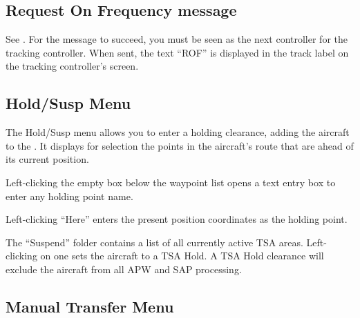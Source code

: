 \documentclass[a4paper,oneside,11pt]{memoir}
\begin{document}
\subsection{Request On Frequency message}
\label{menu:rof}

See . For the message to succeed, you must be seen as the next controller for the tracking controller. When sent, the text “ROF” is displayed in the track label on the tracking controller’s screen.


\subsection{Hold/Susp Menu}
\label{menu:hold}


The Hold/Susp menu allows you to enter a holding clearance, adding the aircraft to the . It displays for selection the points in the aircraft’s route that are ahead of its current position.

\bigskip

Left-clicking the empty box below the waypoint list opens a text entry box to enter any holding point name.

\bigskip

Left-clicking “Here” enters the present position coordinates as the holding point.

\bigskip

The “Suspend” folder contains a list of all currently active TSA areas. Left-clicking on one sets the aircraft to a TSA Hold. A TSA Hold clearance will exclude the aircraft from all APW and SAP processing.

\subsection{Manual Transfer Menu}
\label{menu:mxfr}
\end{document}
